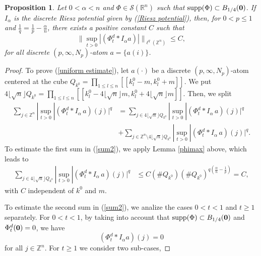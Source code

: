 \documentclass[leqno,12pt]{article} %
\newcommand\supp{\mathop{\rm supp}}
\theoremstyle{plain} %
\newtheorem{proposition}[theorem]{\indent\sc Proposition}
\theoremstyle{definition} %
\begin{document}
\begin{proposition} \label{maximal atom estim}
Let $0 < \alpha < n$ and $\Phi \in \mathcal{S}(\mathbb{R}^n)$ such that $\supp(\Phi) \subset B_{1/4}({\bf 0})$. If $I_{\alpha}$ is the discrete Riesz potential given by (\ref{Riesz potential}), then, for $0 < p \leq 1$ and $\frac{1}{q} = \frac{1}{p} - \frac{\alpha}{n}$, there exists a positive constant $C$ such that
\begin{equation} \label{uniform estimate}
\|\sup_{t>0}|(\Phi_{t}^d \ast I_{\alpha} a)| \|_{\ell^{q}(\mathbb{Z}^n)} \leq C,
\end{equation}
for all discrete $(p, \infty, N_p)$-atom $a = \{ a(i) \}$.
\end{proposition}

\begin{proof}
To prove (\ref{uniform estimate}), let $a(\cdot)$ be a discrete $(p, \infty, N_p)$-atom centered at the cube 
$Q_{k^0}= \displaystyle{\prod_{1 \leq l \leq n}}\left[\left[ k^0_l - m, k^0_l + m \right]\right]$. We put
$4\lfloor \sqrt{n} \rfloor Q_{k^0} = \displaystyle{\prod_{1 \leq l \leq n}} \left[\left[ k^0_l - 4\lfloor \sqrt{n} \rfloor m, k^0_l + 4\lfloor \sqrt{n} \rfloor m \right]\right]$. Then, we split
\begin{align}
\sum_{j \in \mathbb{Z}^n} |\sup_{t>0}|(\Phi_{t}^d \ast I_{\alpha} \, a)(j)|^{q} &= \sum_{j \in 4\lfloor \sqrt{n} \rfloor Q_{k^0}} 
|\sup_{t>0}|(\Phi_{t}^d \ast I_{\alpha} \, a)(j)|^{q} \label{sum2} \\
&+ \sum_{j \in \mathbb{Z}^n \setminus 4\lfloor \sqrt{n} \rfloor Q_{k^0}} |\sup_{t>0}|(\Phi_{t}^d \ast I_{\alpha} \, a)(j)|^{q}. \nonumber
\end{align} 
To estimate the first sum in (\ref{sum2}), we apply Lemma \ref{phimax} above, which leads to
\begin{align}
\sum_{j \in 4\lfloor \sqrt{n} \rfloor Q_{k^0}}|\sup_{t>0}|(\Phi_{t}^d \ast I_{\alpha} \, a)(j)|^{q} &\leq  
C (\# Q_{k^0}) (\# Q_{k^0})^{q(\frac{\alpha}{n} - \frac{1}{p})} = C, \label{estim C}
\end{align}
with $C$ independent of $k^0$ and $m$.

To estimate the second sum in (\ref{sum2}), we analize the cases $0 < t < 1$ and $t \geq 1$ separately. For $0 < t < 1$, by taking into account that $\supp(\Phi) \subset B_{1/4}({\bf 0})$ and $\Phi^{d}_{t}({\bf 0}) = 0$, we have 
\begin{equation} \label{cero}
(\Phi_t^d \ast I_{\alpha}a)(j) = 0
\end{equation}
for all $j \in \mathbb{Z}^n$. For $t \geq 1$ we consider two sub-cases,


\end{proof}
\end{document}
